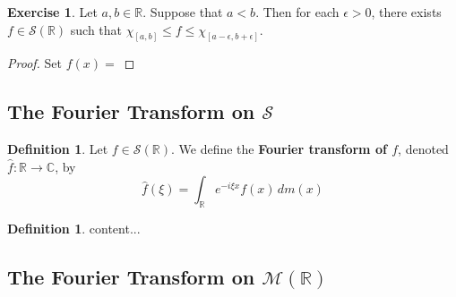\documentclass[12pt]{amsart}
\theoremstyle{definition}
\newtheorem{defn}[definition]{Definition}
\newtheorem{ex}[definition]{Exercise}
\newcommand{\ep}{\epsilon}
\newcommand{\C}{\mathbb{C}}
\newcommand{\R}{\mathbb{R}}
\newcommand{\MS}{\mathcal{S}}
\newcommand{\MM}{\mathcal{M}}
\begin{document}
	

	\begin{ex}
		Let $a,b \in \R$. Suppose that $a < b$. Then for each $\ep >0$, there exists $f \in \MS(\R)$ such that $\chi_{[a,b]} \leq f \leq \chi_{[a-\ep , b + \ep]}$.
	\end{ex}

	\begin{proof}
		Set $f(x) = $
	\end{proof}
	
	
	
	
	
	
	
	
	
	
	
	
	
	
	
	
	
	
	
	\newpage
	\subsection{The Fourier Transform on $\MS$}
	
	\begin{defn}
		Let $f \in \MS(\R)$. We define the \textbf{Fourier transform of $f$}, denoted $\hat{f}: \R \rightarrow \C$, by $$\hat{f}(\xi) = \int_{\R} e^{-i \xi x}f(x) \, dm(x)$$ 
	\end{defn}

	\begin{defn}
		content...
	\end{defn}
	
	
	
	
	
	
	
	
	
	
	
	
	
	
	
	
	
	
	
	
	\newpage
	\subsection{The Fourier Transform on $\MM(\R)$}
	
	
	
	
	
	
	
	
	
	
	
	
	
	
	
\end{document}
